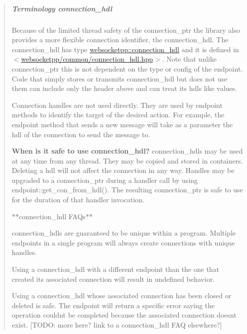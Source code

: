 \begin{quote}
\subparagraph*{Terminology {\ttfamily connection\+\_\+hdl}}

Because of the limited thread safety of the {\ttfamily connection\+\_\+ptr} the library also provides a more flexible connection identifier, the {\ttfamily connection\+\_\+hdl}. The {\ttfamily connection\+\_\+hdl} has type {\ttfamily \mbox{\hyperlink{namespacewebsocketpp_a6b3d26a10ee7229b84b776786332631d}{websocketpp\+::connection\+\_\+hdl}}} and it is defined in {\ttfamily $<$\mbox{\hyperlink{connection__hdl_8hpp_source}{websocketpp/common/connection\+\_\+hdl.\+hpp}}$>$}. Note that unlike {\ttfamily connection\+\_\+ptr} this is not dependent on the type or config of the endpoint. Code that simply stores or transmits {\ttfamily connection\+\_\+hdl} but does not use them can include only the header above and can treat its hdls like values.

Connection handles are not used directly. They are used by endpoint methods to identify the target of the desired action. For example, the endpoint method that sends a new message will take as a parameter the hdl of the connection to send the message to.

{\bfseries When is it safe to use {\ttfamily connection\+\_\+hdl}?} {\ttfamily connection\+\_\+hdl}s may be used at any time from any thread. They may be copied and stored in containers. Deleting a hdl will not affect the connection in any way. Handles may be upgraded to a {\ttfamily connection\+\_\+ptr} during a handler call by using {\ttfamily endpoint\+::get\+\_\+con\+\_\+from\+\_\+hdl()}. The resulting {\ttfamily connection\+\_\+ptr} is safe to use for the duration of that handler invocation.

$\ast$$\ast${\ttfamily connection\+\_\+hdl} F\+A\+Qs$\ast$$\ast$
\begin{DoxyItemize}
\item {\ttfamily connection\+\_\+hdl}s are guaranteed to be unique within a program. Multiple endpoints in a single program will always create connections with unique handles.
\item Using a {\ttfamily connection\+\_\+hdl} with a different endpoint than the one that created its associated connection will result in undefined behavior.
\item Using a {\ttfamily connection\+\_\+hdl} whose associated connection has been closed or deleted is safe. The endpoint will return a specific error saying the operation couldn\textquotesingle{}t be completed because the associated connection doesn\textquotesingle{}t exist. \mbox{[}T\+O\+DO\+: more here? link to a connection\+\_\+hdl F\+AQ elsewhere?\mbox{]} 
\end{DoxyItemize}\end{quote}


